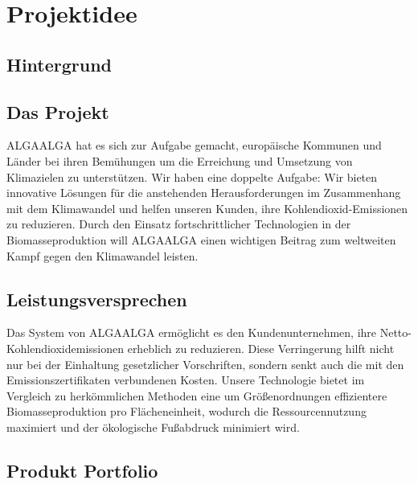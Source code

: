 \chapter{Projektidee}

\section{Hintergrund}

\section{Das Projekt}
ALGAALGA hat es sich zur Aufgabe gemacht, europäische Kommunen und Länder bei ihren Bemühungen um die Erreichung und Umsetzung von Klimazielen zu unterstützen.
Wir haben eine doppelte Aufgabe: Wir bieten innovative Lösungen für die anstehenden Herausforderungen im Zusammenhang mit dem Klimawandel und helfen unseren Kunden, ihre Kohlendioxid-Emissionen zu reduzieren.
Durch den Einsatz fortschrittlicher Technologien in der Biomasseproduktion will ALGAALGA einen wichtigen Beitrag zum weltweiten Kampf gegen den Klimawandel leisten.

\section{Leistungsversprechen}
Das System von ALGAALGA ermöglicht es den Kundenunternehmen, ihre Netto-Kohlendioxidemissionen erheblich zu reduzieren. Diese Verringerung hilft nicht nur bei der Einhaltung gesetzlicher Vorschriften, sondern senkt auch die mit den Emissionszertifikaten verbundenen Kosten. Unsere Technologie bietet im Vergleich zu herkömmlichen Methoden eine um Größenordnungen effizientere Biomasseproduktion pro Flächeneinheit, wodurch die Ressourcennutzung maximiert und der ökologische Fußabdruck minimiert wird.

\section{Produkt Portfolio}

